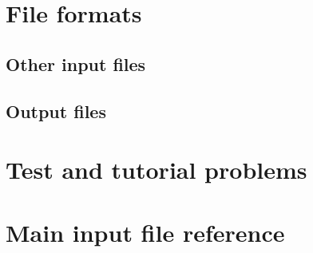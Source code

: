 \documentclass[12pt,a4paper]{report}
\begin{document}




\chapter{File formats}


\section{Other input files}



\section{Output files}

% 
%   


\chapter{Test and tutorial problems}


\chapter{Main input file reference}







\end{document}
